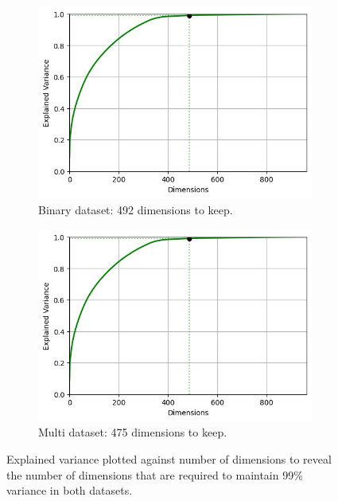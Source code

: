 \documentclass[letterpaper,12pt]{article}
\begin{document}
\begin{figure}[h]
\centering
\begin{subfigure}{0.5\textwidth}
  \centering
  \includegraphics[width=\textwidth]{report/figures/explained_variance_multi.png}
  \caption{Binary dataset: 492 dimensions to keep.}
  \label{fig:explained_variance_binary}
\end{subfigure}%
\begin{subfigure}{.5\textwidth}
  \centering
  \includegraphics[width=\textwidth]{report/figures/explained_variance_multi.png}
    \caption{Multi dataset: 475 dimensions to keep.}
  \label{fig:explained_variance_multi}
\end{subfigure}
\caption{\label{fig:explained_variance}Explained variance plotted against number of dimensions to reveal the number of dimensions that are  required to maintain 99\% variance in both datasets.}
\end{figure}
\end{document}
